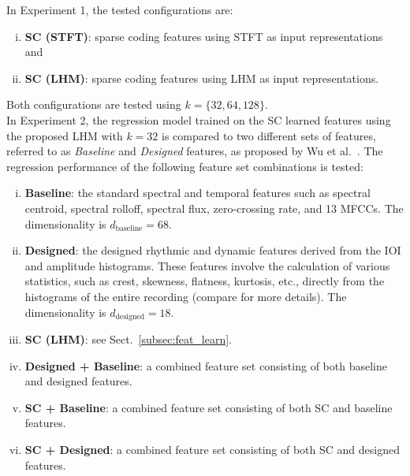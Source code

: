 \documentclass[conference]{IEEEtran}
\begin{document}
In Experiment 1, the tested configurations are:%
\begin{enumerate}[(i)]
\item \textbf{SC (STFT)}: sparse coding features using STFT as input representations and
\item \textbf{SC (LHM)}: sparse coding features using LHM as input representations.
\end{enumerate}
Both configurations are tested using $k = \{32, 64, 128\}$.\\

In Experiment 2, the regression model trained on the SC learned features using the proposed LHM with $k = 32$ is compared to two different sets of features, referred to as \textit{Baseline} and \textit{Designed} features, as proposed by Wu et al.~\cite{Wu2016}. The regression performance of the following feature set combinations is tested:
\begin{enumerate}[(i)]
\item \textbf{Baseline}: the standard spectral and temporal features such as spectral centroid, spectral rolloff, spectral flux, zero-crossing rate, and 13 MFCCs. The dimensionality is $d_\mathrm{baseline} = 68$.
\item \textbf{Designed}: the designed rhythmic and dynamic features derived from the IOI and amplitude histograms. These features involve the calculation of various statistics, such as crest, skewness, flatness, kurtosis, etc., directly from the histograms of the entire recording (compare \cite{Wu2016} for more details). The dimensionality is $d_\mathrm{designed} = 18$. 

\item \textbf{SC (LHM)}: see Sect.~\ref{subsec:feat_learn}. %
\item \textbf{Designed + Baseline}: a combined feature set consisting of both baseline and designed features. %
\item \textbf{SC + Baseline}:  a combined feature set consisting of both SC and baseline features.
\item \textbf{SC + Designed}:  a combined feature set consisting of both SC and designed features.
\end{enumerate}
\end{document}
